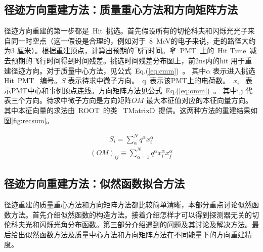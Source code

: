 \subsection{径迹方向重建方法：质量重心方法和方向矩阵方法}
径迹方向重建的第一步都是~Hit~挑选。首先假设所有的切伦科夫和闪烁光光子来自同一时空点（这一假设是合理的，例如对于~8~MeV的电子来说，走的路径大约为3 厘米）。根据重建顶点，计算出预期的飞行时间。拿~PMT~上的~Hit Time~减去预期的飞行时间得到时间残差。挑选时间残差分布图上，前2ns内的hit 用于重建径迹方向。对于质量中心方法，见公式~Eq.(\ref{eq:cmm})~。 其中$\alpha$ 表示进入挑选Hit~PMT~ 编号。$S$ 表示待求中微子方向。~q~表示该PMT上的电荷数。~$x_i$~ 表示PMT中心和事例顶点连线。方向矩阵方法见公式~Eq.(\ref{eq:omm})~。 其中i,j 代表三个方向。待求中微子方向是方向矩阵$OM$ 最大本征值对应的本征向量方向。其中本征向量的求法由~ROOT~的类 ~TMatrixD~提供。这两种方法的重建结果如图\ref{fig:recsum}。

\begin{equation}\label{eq:cmm}
\begin{split}
S_i = \sum^N_{\alpha} q^{\alpha}x^{\alpha}_i
\end{split}
\end{equation}
\begin{eqnarray}\label{eq:omm}
(OM)_{ij}\equiv \sum_{\alpha=1}^{N} q^{\alpha}x^{\alpha}_i x^{\alpha}_j
\end{eqnarray}

\subsection{径迹方向重建方法：似然函数拟合方法}
径迹重建的质量重心方法和方向矩阵方法都比较简单清晰，本部分重点讨论似然函数方法。首先介绍似然函数的构造方法。接着介绍怎样才可以得到探测器无关的切伦科夫光和闪烁光角分布函数。第三部分介绍遇到的问题及其讨论及解决方法。最后给出似然函数方法及质量中心方法和方向矩阵方法在不同能量下的方向重建精度。
